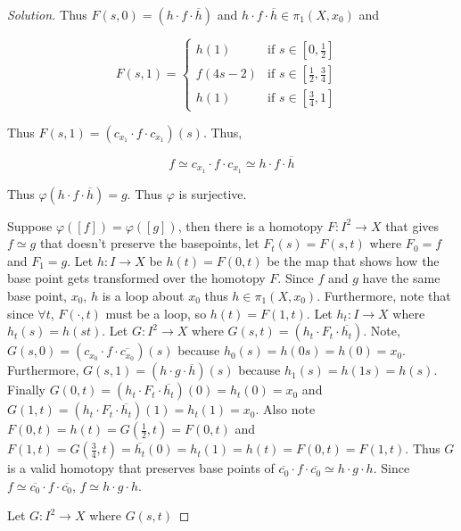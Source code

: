 \documentclass{article}
\newenvironment{solution}
{\renewcommand\qedsymbol{$\blacksquare$}\begin{proof}[Solution]}
{\end{proof}}
\begin{document}
\begin{solution}
    Thus $F(s, 0) = (h \cdot f \cdot \overline{h})$ and $h \cdot f \cdot \overline{h} \in \pi_{1}(X, x_0)$  and 
    
    \begin{equation*}
        F(s, 1) = \begin{cases*}
            h(1) & \text{if $s \in [0, \frac{1}{2}]$ } \\
            f(4s - 2) & \text{if $s \in [\frac{1}{2},\frac{3}{4}]$ } \\
            h(1) & \text{if $s \in [\frac{3}{4}, 1]$ }
        \end{cases*}
    \end{equation*}

    Thus $F(s, 1) = (c_{x_1} \cdot f \cdot c_{x_1})(s)$. Thus, 

    \[f \simeq c_{x_1} \cdot f \cdot c_{x_1} \simeq h \cdot f \cdot \overline{h}\]

    Thus $\varphi(h \cdot f \cdot \overline{h}) = g$. Thus $\varphi$ is surjective.

    Suppose $\varphi([f]) = \varphi([g])$, then there is a homotopy $F: I^2 \to X$ that gives $f \simeq g$ that doesn't preserve the basepoints, let $F_t(s) = F(s, t)$ where $F_0 = f$ and $F_1 = g$. Let $h: I \to X$ be $h(t) = F(0, t)$ be the map that shows how the base point gets transformed over the homotopy $F$. Since $f$ and $g$ have the same base point, $x_0$, $h$ is a loop about $x_0$ thus $h \in \pi_1(X, x_0)$. Furthermore, note that since $\forall t$, $F(\cdot, t)$ must be a loop, so $h(t) = F(1, t)$. Let $h_t : I \to X$ where $h_t(s) = h(st)$. Let $G: I^2 \to X$ where $G(s, t) = (h_t \cdot F_t \cdot \overline{h_t})$. Note, $G(s, 0) = (c_{x_0} \cdot f \cdot \overline{c_{x_0}})(s)$ because $h_0(s) = h(0s) = h(0) = x_0$. Furthermore, $G(s, 1) = (h \cdot g \cdot \overline{h})(s)$ because $h_1(s) = h(1s) = h(s)$. Finally $G(0, t) = (h_t \cdot F_t \cdot \overline{h_t})(0) = h_t(0) = x_0$ and $G(1, t) = (h_t \cdot F_t \cdot \overline{h_t})(1) = h_t(1) = x_0$. Also note $F(0, t) = h(t) = G(\frac{1}{2}, t) = F(0, t)$ and $F(1, t) = G(\frac{3}{4}, t) = \overline{h_t}(0) = h_t(1) = h(t) = F(0, t) = F(1, t)$. Thus $G$ is a valid homotopy that preserves base points of $\overline{c_0} \cdot f \cdot \overline{c_0} \simeq h \cdot g \cdot h$. Since $f \simeq \overline{c_0} \cdot f \cdot \overline{c_0}$, $f \simeq h \cdot g \cdot h$.                  
    
    Let $G : I^2 \to X$ where $G(s, t)$  


\end{solution}
\end{document}
